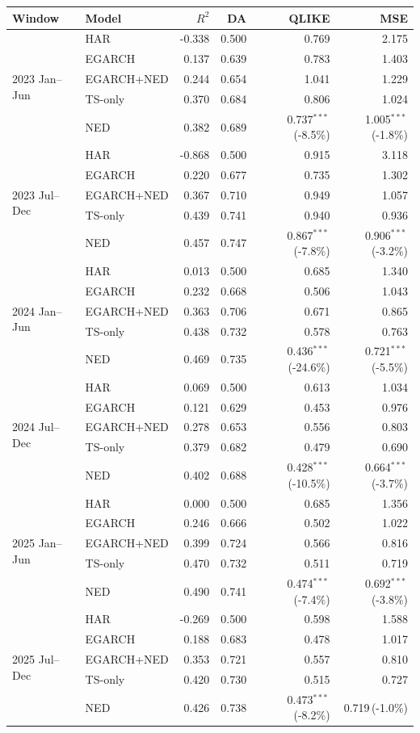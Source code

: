 \begin{tabular}{@{}llrrrr@{}}
\toprule
Window & Model & $R^2$ & DA & QLIKE & MSE \\
\midrule
\multirow{5}{*}{2023 Jan--Jun} & HAR & -0.338 & 0.500 & 0.769 & 2.175 \\
 & EGARCH & 0.137 & 0.639 & 0.783 & 1.403 \\
 & EGARCH+NED & 0.244 & 0.654 & 1.041 & 1.229 \\
 & TS-only & 0.370 & 0.684 & 0.806 & 1.024 \\
 & NED & 0.382 & 0.689 & 0.737$^{***}$\,(-8.5\%) & 1.005$^{***}$\,(-1.8\%) \\
\midrule
\multirow{5}{*}{2023 Jul--Dec} & HAR & -0.868 & 0.500 & 0.915 & 3.118 \\
 & EGARCH & 0.220 & 0.677 & 0.735 & 1.302 \\
 & EGARCH+NED & 0.367 & 0.710 & 0.949 & 1.057 \\
 & TS-only & 0.439 & 0.741 & 0.940 & 0.936 \\
 & NED & 0.457 & 0.747 & 0.867$^{***}$\,(-7.8\%) & 0.906$^{***}$\,(-3.2\%) \\
\midrule
\multirow{5}{*}{2024 Jan--Jun} & HAR & 0.013 & 0.500 & 0.685 & 1.340 \\
 & EGARCH & 0.232 & 0.668 & 0.506 & 1.043 \\
 & EGARCH+NED & 0.363 & 0.706 & 0.671 & 0.865 \\
 & TS-only & 0.438 & 0.732 & 0.578 & 0.763 \\
 & NED & 0.469 & 0.735 & 0.436$^{***}$\,(-24.6\%) & 0.721$^{***}$\,(-5.5\%) \\
\midrule
\multirow{5}{*}{2024 Jul--Dec} & HAR & 0.069 & 0.500 & 0.613 & 1.034 \\
 & EGARCH & 0.121 & 0.629 & 0.453 & 0.976 \\
 & EGARCH+NED & 0.278 & 0.653 & 0.556 & 0.803 \\
 & TS-only & 0.379 & 0.682 & 0.479 & 0.690 \\
 & NED & 0.402 & 0.688 & 0.428$^{***}$\,(-10.5\%) & 0.664$^{***}$\,(-3.7\%) \\
\midrule
\multirow{5}{*}{2025 Jan--Jun} & HAR & 0.000 & 0.500 & 0.685 & 1.356 \\
 & EGARCH & 0.246 & 0.666 & 0.502 & 1.022 \\
 & EGARCH+NED & 0.399 & 0.724 & 0.566 & 0.816 \\
 & TS-only & 0.470 & 0.732 & 0.511 & 0.719 \\
 & NED & 0.490 & 0.741 & 0.474$^{***}$\,(-7.4\%) & 0.692$^{***}$\,(-3.8\%) \\
\midrule
\multirow{5}{*}{2025 Jul--Dec} & HAR & -0.269 & 0.500 & 0.598 & 1.588 \\
 & EGARCH & 0.188 & 0.683 & 0.478 & 1.017 \\
 & EGARCH+NED & 0.353 & 0.721 & 0.557 & 0.810 \\
 & TS-only & 0.420 & 0.730 & 0.515 & 0.727 \\
 & NED & 0.426 & 0.738 & 0.473$^{***}$\,(-8.2\%) & 0.719\,(-1.0\%) \\
\bottomrule
\end{tabular}

